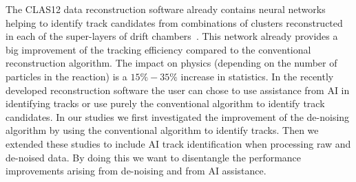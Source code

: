 The CLAS12 data reconstruction software already contains neural networks helping to identify track candidates from combinations of clusters reconstructed in each of the super-layers of drift chambers~\cite{Gavalian:2022mlp}.
This network already provides a big improvement of the tracking efficiency compared to the conventional reconstruction algorithm. The impact on physics (depending on the number of particles in the reaction) is a $15\%-35\%$ increase in statistics. 
In the recently developed reconstruction software the user can chose to use assistance from AI in identifying tracks or use purely the conventional algorithm to identify track candidates. In our studies we first investigated the improvement of the de-noising algorithm by using the conventional algorithm to identify tracks. Then we extended these studies to include AI track identification when processing raw and de-noised data. By doing this we want to disentangle the performance improvements arising from de-noising and from AI assistance. 


 
